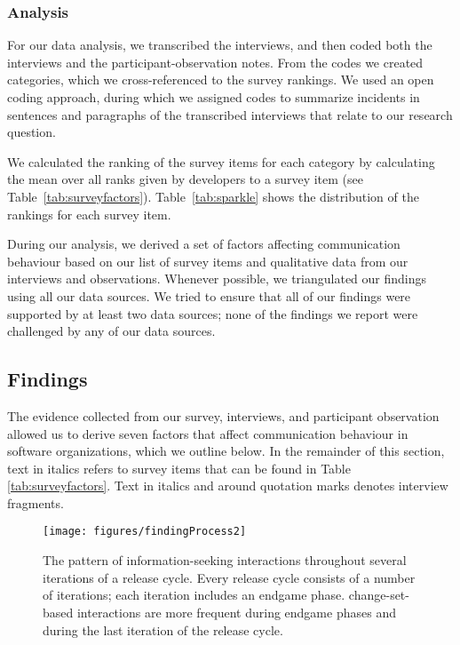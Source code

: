 \subsubsection{Analysis} 
For our data analysis, we transcribed the interviews, and then coded both the interviews and the participant-observation notes. From the codes we created categories, which we cross-referenced to the survey rankings. We used an open coding approach, during which we assigned codes to summarize incidents in sentences and paragraphs of the transcribed interviews that relate to our research question.

We calculated the ranking of the survey items for each category by calculating the mean over all ranks given by developers to a survey item (see Table~\ref{tab:surveyfactors}).
Table~\ref{tab:sparkle} shows the distribution of the rankings for each survey item.

During our analysis, we derived a set of factors affecting communication behaviour based on our list of survey items and qualitative data from our interviews and observations. Whenever possible, we triangulated our findings using all our data sources. We tried to ensure that all of our findings were supported by at least two data sources; none of the findings we report were challenged by any of our data sources. 


\subsection{Findings}
\label{sec:findings}
The evidence collected from our survey, interviews, and participant observation allowed us to derive seven factors that affect communication behaviour in software organizations, which we outline below. In the remainder of this section, text in italics refers to survey items that can be found in Table \ref{tab:surveyfactors}. Text in italics and around quotation marks denotes interview fragments.

\begin{figure*}[tb]
\centering
\texttt{[image: figures/findingProcess2]}
\vspace{-20pt}\caption{The pattern of information-seeking interactions throughout several iterations of a release cycle. Every release cycle consists of a number of iterations; each iteration includes an endgame phase. change-set-based interactions are more frequent during endgame phases and during the last iteration of the release cycle.}
\label{IterationsFig}
\end{figure*}



